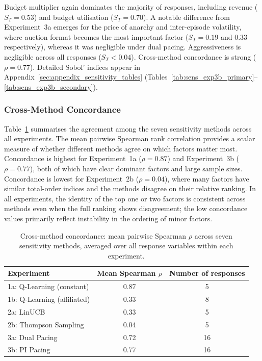 Budget multiplier again dominates the majority of responses, including revenue ($S_T = 0.53$) and budget utilisation ($S_T = 0.70$). A notable difference from Experiment~3a emerges for the price of anarchy and inter-episode volatility, where auction format becomes the most important factor ($S_T = 0.19$ and $0.33$ respectively), whereas it was negligible under dual pacing. Aggressiveness is negligible across all responses ($S_T < 0.04$). Cross-method concordance is strong ($\rho = 0.77$). Detailed Sobol' indices appear in Appendix~\ref{sec:appendix_sensitivity_tables} (Tables~\ref{tab:sens_exp3b_primary}--\ref{tab:sens_exp3b_secondary}).

\subsubsection{Cross-Method Concordance}
\label{sec:sens_concordance}

Table~\ref{tab:sens_concordance} summarises the agreement among the seven sensitivity methods across all experiments. The mean pairwise Spearman rank correlation provides a scalar measure of whether different methods agree on which factors matter most. Concordance is highest for Experiment~1a ($\rho = 0.87$) and Experiment~3b ($\rho = 0.77$), both of which have clear dominant factors and large sample sizes. Concordance is lowest for Experiment~2b ($\rho = 0.04$), where many factors have similar total-order indices and the methods disagree on their relative ranking. In all experiments, the identity of the top one or two factors is consistent across methods even when the full ranking shows disagreement; the low concordance values primarily reflect instability in the ordering of minor factors.

\begin{table}[H]
\centering
\caption{Cross-method concordance: mean pairwise Spearman $\rho$ across seven sensitivity methods, averaged over all response variables within each experiment.}
\label{tab:sens_concordance}
\small
\begin{tabular}{lcc}
\toprule
Experiment & Mean Spearman $\rho$ & Number of responses \\
\midrule
1a: Q-Learning (constant)       & 0.87 & 5 \\
1b: Q-Learning (affiliated)     & 0.33 & 8 \\
2a: LinUCB                     & 0.33 & 5 \\
2b: Thompson Sampling          & 0.04 & 5 \\
3a: Dual Pacing                & 0.72 & 16 \\
3b: PI Pacing                  & 0.77 & 16 \\
\bottomrule
\end{tabular}
\end{table}


